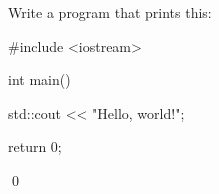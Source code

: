 Write a program that prints this:

\begin{console}

#include <iostream>



int main()

{

    std::cout << "Hello, world!\n";



    return 0;

}

\end{console}

\qed

